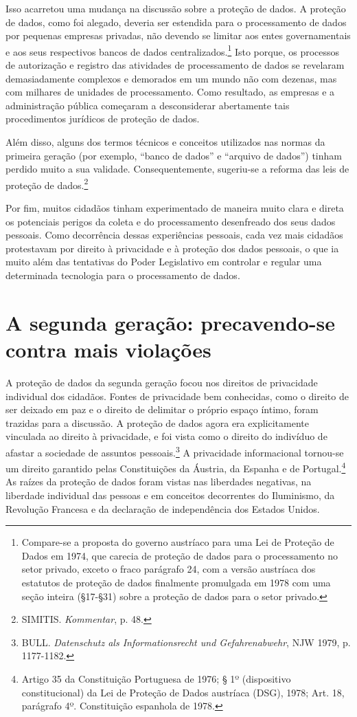 Isso acarretou uma mudança na discussão sobre a proteção de dados. A
proteção de dados, como foi alegado, deveria ser estendida para o
processamento de dados por pequenas empresas privadas, não devendo se
limitar aos entes governamentais e aos seus respectivos bancos de dados
centralizados.\footnote{Compare-se a proposta do governo austríaco para
  uma Lei de Proteção de Dados em 1974, que carecia de proteção de dados
  para o processamento no setor privado, exceto o fraco parágrafo 24,
  com a versão austríaca dos estatutos de proteção de dados finalmente
  promulgada em 1978 com uma seção inteira (§17-§31) sobre a proteção de
  dados para o setor privado.} Isto porque, os processos de autorização
e registro das atividades de processamento de dados se revelaram
demasiadamente complexos e demorados em um mundo não com dezenas, mas
com milhares de unidades de processamento. Como resultado, as empresas e
a administração pública começaram a desconsiderar abertamente tais
procedimentos jurídicos de proteção de dados.

Além disso, alguns dos termos técnicos e conceitos utilizados nas normas
da primeira geração (por exemplo, ``banco de dados'' e ``arquivo de
dados'') tinham perdido muito a sua validade. Consequentemente,
sugeriu-se a reforma das leis de proteção de dados.\footnote{SIMITIS.
  \emph{Kommentar}, p. 48.}

Por fim, muitos cidadãos tinham experimentado de maneira muito clara e
direta os potenciais perigos da coleta e do processamento desenfreado
dos seus dados pessoais. Como decorrência dessas experiências pessoais,
cada vez mais cidadãos protestavam por direito à privacidade e à
proteção dos dados pessoais, o que ia muito além das tentativas do Poder
Legislativo em controlar e regular uma determinada tecnologia para o
processamento de dados.

\section{A segunda geração: precavendo-se contra mais violações}

A proteção de dados da segunda geração focou nos direitos de privacidade
individual dos cidadãos. Fontes de privacidade bem conhecidas, como o
direito de ser deixado em paz e o direito de delimitar o próprio espaço
íntimo, foram trazidas para a discussão. A proteção de dados agora era
explicitamente vinculada ao direito à privacidade, e foi vista como o
direito do indivíduo de afastar a sociedade de assuntos
pessoais.\footnote{BULL. \emph{Datenschutz als Informationsrecht und
  Gefahrenabwehr}, NJW 1979, p. 1177-1182.} A privacidade informacional
tornou-se um direito garantido pelas Constituições da Áustria, da
Espanha e de Portugal.\footnote{Artigo 35 da Constituição Portuguesa de
  1976; § 1º (dispositivo constitucional) da Lei de Proteção de Dados
  austríaca (DSG), 1978; Art. 18, parágrafo 4º. Constituição espanhola
  de 1978.} As raízes da proteção de dados foram vistas nas liberdades
negativas, na liberdade individual das pessoas e em conceitos
decorrentes do Iluminismo, da Revolução Francesa e da declaração de
independência dos Estados Unidos.


